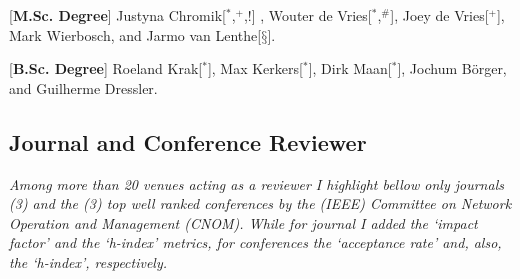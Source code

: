 \documentclass[print]{styles/friggeri-cv-mac} %
\begin{document}
\begin{entrylist}
\vspace{-0.3cm}
\entry
{[\textbf{M.Sc. Degree}]}
{\textnormal{Justyna Chromik[$^*$,$^+$,$!$] , Wouter de Vries[$^*$,$^\#$], Joey de Vries[$^+$], Mark Wierbosch, and Jarmo van Lenthe[$§$].}}
{}

\vspace{-0.3cm}
\entry
{[\textbf{B.Sc. Degree}]}
{\textnormal{Roeland Krak[$^*$], Max Kerkers[$^*$], Dirk Maan[$^*$], Jochum Börger, and Guilherme Dressler.}} 
{}

\end{entrylist}



\subsection{Journal and Conference Reviewer}\vspace{-5pt}

\textit{Among more than 20 venues acting as a
reviewer I highlight bellow only journals (3) and the (3) top well ranked conferences by the
(IEEE) Committee on Network Operation and Management (CNOM). While for journal
I added the `impact factor' and the `h-index' metrics, for conferences the
`acceptance rate' and, also, the `h-index', respectively.}
\end{document}
